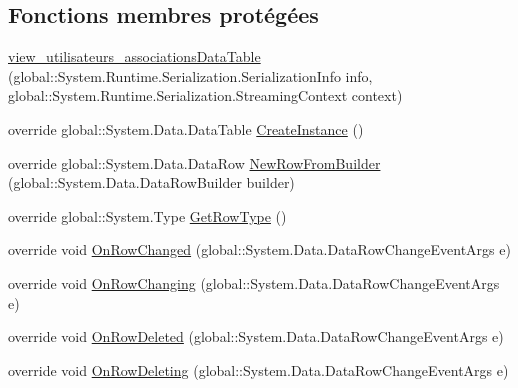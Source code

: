 \subsection*{Fonctions membres protégées}
\begin{DoxyCompactItemize}
\item 
\hyperlink{classforma_1_1formadb_data_set_1_1view__utilisateurs__associations_data_table_ad83594f85fab361e3179d8a9e8066655}{view\+\_\+utilisateurs\+\_\+associations\+Data\+Table} (global\+::\+System.\+Runtime.\+Serialization.\+Serialization\+Info info, global\+::\+System.\+Runtime.\+Serialization.\+Streaming\+Context context)
\item 
override global\+::\+System.\+Data.\+Data\+Table \hyperlink{classforma_1_1formadb_data_set_1_1view__utilisateurs__associations_data_table_ac8162afd156545d0bc960a0e2cfab8f5}{Create\+Instance} ()
\item 
override global\+::\+System.\+Data.\+Data\+Row \hyperlink{classforma_1_1formadb_data_set_1_1view__utilisateurs__associations_data_table_a549d62ff609d3a1e9f7b0949f561353a}{New\+Row\+From\+Builder} (global\+::\+System.\+Data.\+Data\+Row\+Builder builder)
\item 
override global\+::\+System.\+Type \hyperlink{classforma_1_1formadb_data_set_1_1view__utilisateurs__associations_data_table_a3d88101dcb44b27fb3acf898e94f6abf}{Get\+Row\+Type} ()
\item 
override void \hyperlink{classforma_1_1formadb_data_set_1_1view__utilisateurs__associations_data_table_a895a113cf1afcb7da95d06db8b3211a6}{On\+Row\+Changed} (global\+::\+System.\+Data.\+Data\+Row\+Change\+Event\+Args e)
\item 
override void \hyperlink{classforma_1_1formadb_data_set_1_1view__utilisateurs__associations_data_table_a094677f600a05b1e1c7bf9eed288a095}{On\+Row\+Changing} (global\+::\+System.\+Data.\+Data\+Row\+Change\+Event\+Args e)
\item 
override void \hyperlink{classforma_1_1formadb_data_set_1_1view__utilisateurs__associations_data_table_a4eaeb841b4bb5566513f618b8d12e92b}{On\+Row\+Deleted} (global\+::\+System.\+Data.\+Data\+Row\+Change\+Event\+Args e)
\item 
override void \hyperlink{classforma_1_1formadb_data_set_1_1view__utilisateurs__associations_data_table_ab21de240e7a6e4ea133a36f24a0f0a5d}{On\+Row\+Deleting} (global\+::\+System.\+Data.\+Data\+Row\+Change\+Event\+Args e)
\end{DoxyCompactItemize}
